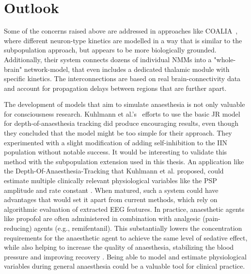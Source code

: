 \section{Outlook}
Some of the concerns raised above are addressed in approaches like COALIA~\cite{bensaid_coalia_2019},
where different neuron-type kinetics are modelled in a way that is similar to the subpopulation approach,
but appears to be more biologically grounded.
Additionally, their system connects dozens of individual NMMs into a "whole-brain" network-model,
that even includes a dedicated thalamic module with specific kinetics.
The interconnections are based on real brain-connectivity data and account for propagation delays
between regions that are further apart.

The development of models that aim to simulate anaesthesia is not only valuable for consciousness research.
Kuhlmann et al.'s~\cite{kuhlmann_neural_2016} efforts to use the basic JR model for depth-of-anaesthesia tracking did
produce encouraging results,
even though they concluded that the model might be too simple for their approach.
They experimented with a slight modification of adding self-inhibition to the IIN population without notable success.
It would be interesting to validate this method with the subpopulation extension used in this thesis.
An application like the Depth-Of-Anaesthesia-Tracking that Kuhlmann et al. proposed,
could estimate multiple clinically relevant physiological variables like the PSP amplitude and rate constant
.
When matured, such a system could have advantages that would set it apart from current methods,
which rely on algorithmic evaluation of extracted EEG features.
In practice, anaesthetic agents like propofol are often administered in combination with analgesic (pain-reducing)
agents (e.g., remifentanil).
This substantially lowers the concentration requirements for the anaesthetic agent to achieve the same level of
sedative effect,
while also helping to increase the quality of anaesthesia, stabilizing the blood pressure and improving recovery
\citationneeded.
Being able to model and estimate physiological variables during general anaesthesia
could be a valuable tool for clinical practice.